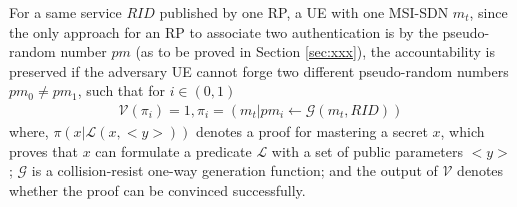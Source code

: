 \begin{definition}
	For a same service $RID$ published by one RP, a UE with one MSI-SDN $m_t$, since the only approach for an RP to associate two authentication is by the pseudo-random number $pm$ (as to be proved in Section \ref{sec:xxx}), the accountability is preserved if the adversary UE cannot forge two different pseudo-random numbers $pm_0\neq pm_1$, such that for $i\in (0,1)$
	\begin{align}
	\mathcal{V}(\pi_i) = 1, \pi_i = (m_t|pm_i\gets\mathcal{G}(m_t, RID))
	\end{align}
	where, $\pi(x|\mathcal{L}(x, <y>))$ denotes a proof for mastering a secret $x$, which proves that $x$ can formulate a predicate $\mathcal{L}$ with a set of public parameters $<y>$; $\mathcal{G}$ is a collision-resist one-way generation function; and the output of $\mathcal{V}$ denotes whether the proof can be convinced successfully.
\end{definition}

